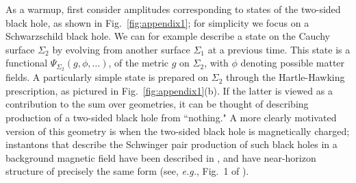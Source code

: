 \documentclass[12pt]{article}
\numberwithin{equation}{section}
\begin{document}
As a warmup, first consider amplitudes corresponding to states of the two-sided black hole, as shown in Fig.~\ref{fig:appendix1}; for simplicity we focus on a Schwarzschild black hole. We can for example  describe a state on the Cauchy surface $\Sigma_2$ by evolving from another surface $\Sigma_1$ at a previous time. This state is a functional $\Psi_{\Sigma_2}(g, \phi,\ldots)$, of the metric $g$ on $\Sigma_2$,  with $\phi$ denoting possible matter fields.  A particularly simple state is prepared on $\Sigma_2$ through the Hartle-Hawking prescription, as pictured in Fig.~\ref{fig:appendix1}(b).  If the latter is viewed as a contribution to the sum over geometries, it can be thought of describing production of a two-sided black hole from ``nothing."  A more clearly motivated version of this geometry is when the two-sided black hole is magnetically charged; instantons that describe the Schwinger pair production of such black holes in a background magnetic field have been described in \cite{Gibbons:1986cq,Garfinkle:1990eq,Garfinkle:1993xk}, and have near-horizon structure of precisely the same form (see, {\it e.g.}, Fig.~1 of \cite{Garfinkle:1993xk}).
\end{document}
